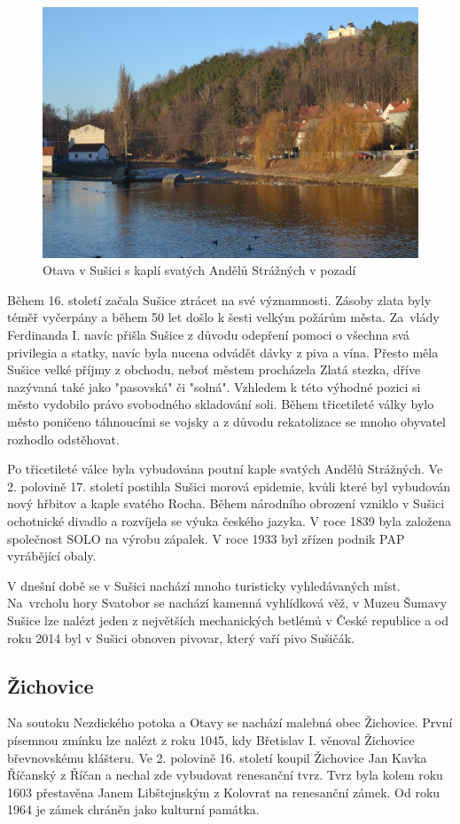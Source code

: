 \documentclass[thesis=M,czech]{FITthesis}[2012/06/26]
\begin{document}
\begin{figure}[h!]
	\centering
	\includegraphics[width=12cm]{pics/susice.jpg}
	\caption{Otava v Sušici s kaplí svatých Andělů Strážných v pozadí}
	\label{obrazek:susice}
\end{figure}

Během 16. století začala Sušice ztrácet na své významnosti. Zásoby zlata byly téměř vyčerpány a během 50 let došlo k šesti velkým požárům města. Za~vlády Ferdinanda I. navíc přišla Sušice z důvodu odepření pomoci o všechna svá privilegia a statky, navíc byla nucena odvádět dávky z piva a vína. Přesto měla Sušice velké příjmy z obchodu, neboť městem procházela Zlatá stezka, dříve nazývaná také jako "pasovská" či "solná". Vzhledem k této výhodné pozici si město vydobilo právo svobodného skladování soli. Během třicetileté války bylo město poničeno táhnoucími se vojsky a z důvodu rekatolizace se mnoho obyvatel rozhodlo odstěhovat. 

Po třicetileté válce byla vybudována poutní kaple svatých Andělů Strážných. Ve 2. polovině 17. století postihla Sušici morová epidemie, kvůli které byl vybudován nový hřbitov a kaple svatého Rocha. Během národního obrození vzniklo v Sušici ochotnické divadlo a rozvíjela se výuka českého jazyka. V roce 1839 byla založena společnost SOLO na výrobu zápalek. V roce 1933 byl zřízen podnik PAP vyrábějící obaly. 

V dnešní době se v Sušici nachází mnoho turisticky vyhledávaných míst. Na~vrcholu hory Svatobor se nachází kamenná vyhlídková věž,  v Muzeu Šumavy Sušice lze nalézt jeden z největších mechanických betlémů v České republice a od roku 2014 byl v Sušici obnoven pivovar, který vaří pivo Sušičák. \cite{SMOOS} \cite{susice}


\subsection{Žichovice}
Na soutoku Nezdického potoka a Otavy se nachází malebná obec Žichovice. První písemnou zmínku lze nalézt z roku 1045, kdy Břetislav I. věnoval Žichovice břevnovskému klášteru. Ve 2. polovině 16. století koupil Žichovice Jan Kavka Říčanský z Říčan a nechal zde vybudovat renesanční tvrz. Tvrz byla kolem roku 1603 přestavěna Janem Libštejnským z Kolovrat na renesanční zámek. Od roku 1964 je zámek chráněn jako kulturní památka. \cite{zichovice}
\end{document}
